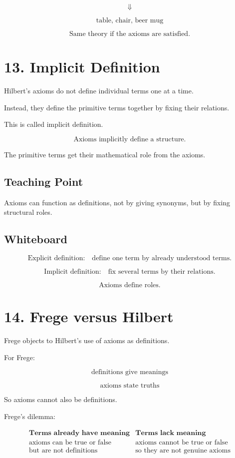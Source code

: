 \documentclass[11pt]{article}
\begin{document}
\[
\Downarrow
\]

\[
\text{table, chair, beer mug}
\]

\[
\text{Same theory if the axioms are satisfied.}
\]

\section*{13. Implicit Definition}

Hilbert's axioms do not define individual terms one at a time.

Instead, they define the primitive terms together by fixing their relations.

This is called implicit definition.

\[
\boxed{
\text{Axioms implicitly define a structure.}
}
\]

The primitive terms get their mathematical role from the axioms.

\subsection*{Teaching Point}

Axioms can function as definitions, not by giving synonyms, but by fixing structural roles.

\subsection*{Whiteboard}

\[
\text{Explicit definition:}
\quad
\text{define one term by already understood terms.}
\]

\[
\text{Implicit definition:}
\quad
\text{fix several terms by their relations.}
\]

\[
\text{Axioms define roles.}
\]

\section*{14. Frege versus Hilbert}

Frege objects to Hilbert's use of axioms as definitions.

For Frege:

\[
\text{definitions give meanings}
\]

\[
\text{axioms state truths}
\]

So axioms cannot also be definitions.

Frege's dilemma:

\[
\begin{array}{c|c}
\textbf{Terms already have meaning} & \textbf{Terms lack meaning} \\
\hline
\text{axioms can be true or false} & \text{axioms cannot be true or false} \\
\text{but are not definitions} & \text{so they are not genuine axioms}
\end{array}
\]
\end{document}
